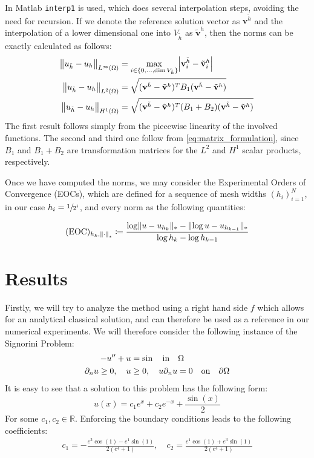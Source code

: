 \documentclass[headsepline,footsepline,footinclude=false,oneside,fontsize=11pt,paper=a4,listof=totoc,bibliography=totoc]{scrbook} %
\begin{document}
In Matlab \verb|interp1| is used, which does several interpolation steps, avoiding the need for recursion. If we denote the reference solution vector as $\mathbf{v}^{\tilde{h}}$ and the interpolation of a lower dimensional one into $V_{\tilde{h}}$ as $\tilde{\mathbf{v}}^h$, then the norms can be exactly calculated as follows:
\begin{align}
	\norm{u_{\tilde{h}} - u_h}_{L^\infty(\Omega)} &= \max_{i \in \{0,\dots,\mathrm{dim} \, V_{\tilde{h}}\}} \abs{\mathbf{v}^{\tilde{h}}_i - \tilde{\mathbf{v}}^h_i} \\
	\norm{u_{\tilde{h}} - u_h}_{L^2(\Omega)} &=  \sqrt{(\mathbf{v}^{\tilde{h}} - \tilde{\mathbf{v}}^h)^T B_1 (\mathbf{v}^{\tilde{h}} - \tilde{\mathbf{v}}^h)}\\
	\norm{u_{\tilde{h}} - u_h}_{H^1(\Omega)} &= \sqrt{(\mathbf{v}^{\tilde{h}} - \tilde{\mathbf{v}}^h)^T (B_1+B_2) (\mathbf{v}^{\tilde{h}} - \tilde{\mathbf{v}}^h)}
\end{align}
The first result follows simply from the piecewise linearity of the involved functions. The second and third one follow from \eqref{eq:matrix_formulation}, since $B_1$ and $B_1 + B_2$ are transformation matrices for the $L^2$ and $H^1$ scalar products, respectively.

Once we have computed the norms, we may consider the Experimental Orders of Convergence (EOCs), which are defined for a sequence of mesh widths $(h_i)_{i=1}^N$, in our case $h_i = \sfrac{1}{2^i}$, and every norm as the following quantities:

\begin{equation}
	(\mathrm{EOC})_{h_k,\,\norm{\cdot}_*} \coloneqq \frac{\log \lVert u-u_{h_k}\rVert_* - \lVert\log u-u_{h_{k-1}}\rVert_* }{\log h_k - \log h_{k-1}}
\end{equation}

\section{Results}
Firstly, we will try to analyze the method using a right hand side $f$ which allows for an analytical classical solution, and can therefore be used as a reference in our numerical experiments. We will therefore consider the following instance of the Signorini Problem:
\begin{align*}
-u'' + u &= \sin \quad \textnormal{in} \quad \Omega \\ 
\partial_n u \geq 0,\quad u &\geq 0,\quad u\partial_nu = 0 \quad\textnormal{on}\quad \partial \Omega 
\end{align*}
It is easy to see that a solution to this problem has the following form:
\begin{equation*}
	u(x) = c_1 e^x + c_2 e^{-x} + \frac{\sin(x)}{2}
\end{equation*}
For some $c_1,c_2 \in \mathbb{R}$. Enforcing the boundary conditions leads to the following coefficients:
\begin{align*}
c_1 = - \frac{e^3\cos(1) - e^1\sin(1)}{2(e^4 + 1)}, \quad c_2 = \frac{e^1\cos(1) + e^3\sin(1)}{2(e^4 + 1)}
\end{align*}
\end{document}
